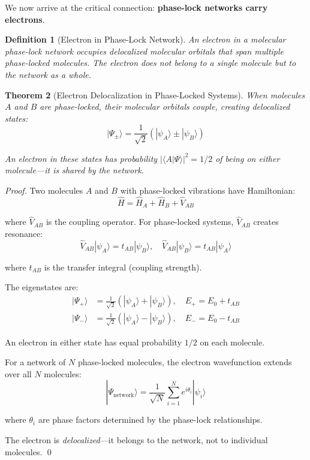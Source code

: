 \documentclass[11pt]{article}
\newtheorem{theorem}{Theorem}[section]
\newtheorem{definition}[theorem]{Definition}
\theoremstyle{remark}
\begin{document}
We now arrive at the critical connection: \textbf{phase-lock networks carry electrons}.

\begin{definition}[Electron in Phase-Lock Network]
\label{def:electron_network}
An electron in a molecular phase-lock network occupies delocalized molecular orbitals that span multiple phase-locked molecules. The electron does not belong to a single molecule but to the network as a whole.
\end{definition}

\begin{theorem}[Electron Delocalization in Phase-Locked Systems]
\label{thm:electron_delocalization}
When molecules $A$ and $B$ are phase-locked, their molecular orbitals couple, creating delocalized states:
\begin{equation}
|\Psi_{\pm}\rangle = \frac{1}{\sqrt{2}} \left(|\psi_A\rangle \pm |\psi_B\rangle\right)
\end{equation}

An electron in these states has probability $|\langle A | \Psi \rangle|^2 = 1/2$ of being on either molecule—it is \textit{shared} by the network.
\end{theorem}

\begin{proof}
Two molecules $A$ and $B$ with phase-locked vibrations have Hamiltonian:
\begin{equation}
\hat{H} = \hat{H}_A + \hat{H}_B + \hat{V}_{AB}
\end{equation}

where $\hat{V}_{AB}$ is the coupling operator. For phase-locked systems, $\hat{V}_{AB}$ creates resonance:
\begin{equation}
\hat{V}_{AB} |\psi_A\rangle = t_{AB} |\psi_B\rangle, \quad \hat{V}_{AB} |\psi_B\rangle = t_{AB} |\psi_A\rangle
\end{equation}

where $t_{AB}$ is the transfer integral (coupling strength).

The eigenstates are:
\begin{align}
|\Psi_+\rangle &= \frac{1}{\sqrt{2}} (|\psi_A\rangle + |\psi_B\rangle), \quad E_+ = E_0 + t_{AB} \\
|\Psi_-\rangle &= \frac{1}{\sqrt{2}} (|\psi_A\rangle - |\psi_B\rangle), \quad E_- = E_0 - t_{AB}
\end{align}

An electron in either state has equal probability $1/2$ on each molecule.

For a network of $N$ phase-locked molecules, the electron wavefunction extends over all $N$ molecules:
\begin{equation}
|\Psi_{\text{network}}\rangle = \frac{1}{\sqrt{N}} \sum_{i=1}^{N} e^{i\theta_i} |\psi_i\rangle
\end{equation}

where $\theta_i$ are phase factors determined by the phase-lock relationships.

The electron is \textit{delocalized}—it belongs to the network, not to individual molecules. \qed
\end{proof}
\end{document}
